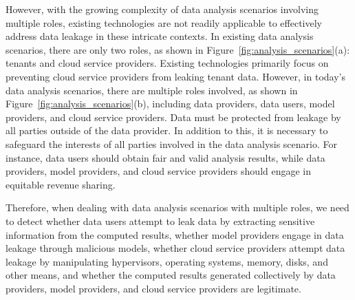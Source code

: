 
However, with the growing complexity of data analysis scenarios involving multiple roles, existing technologies are not readily applicable to effectively address data leakage in these intricate contexts.
In existing data analysis scenarios, there are only two roles, as shown in Figure~\ref{fig:analysis_scenarios}(a): tenants and cloud service providers. Existing technologies primarily focus on preventing cloud service providers from leaking tenant data. However, in today's data analysis scenarios, there are multiple roles involved, as shown in Figure~\ref{fig:analysis_scenarios}(b), including data providers, data users, model providers, and cloud service providers. Data must be protected from leakage by all parties outside of the data provider. In addition to this, it is necessary to safeguard the interests of all parties involved in the data analysis scenario. For instance, data users should obtain fair and valid analysis results, while data providers, model providers, and cloud service providers should engage in equitable revenue sharing.

Therefore, when dealing with data analysis scenarios with multiple roles, we need to detect whether data users attempt to leak data by extracting sensitive information from the computed results, whether model providers engage in data leakage through malicious models, whether cloud service providers attempt data leakage by manipulating hypervisors, operating systems, memory, disks, and other means, and whether the computed results generated collectively by data providers, model providers, and cloud service providers are legitimate.

